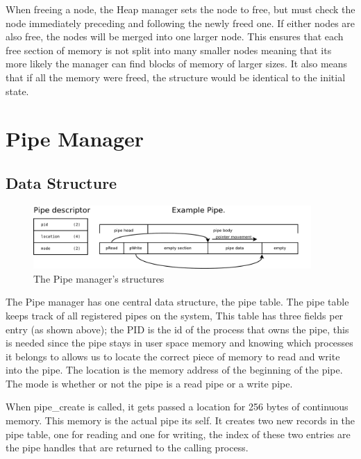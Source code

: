\documentclass[a4paper]{report}
\begin{document}
When freeing a node, the Heap manager sets the node to free, but must check the node immediately preceding and following the newly freed one. If either nodes are also free, the nodes will be merged into one larger node. This ensures that each free section of memory is not split into many smaller nodes meaning that its more likely the manager can find blocks of memory of larger sizes. It also means that if all the memory were freed, the structure would be identical to the initial state.
















\section{Pipe Manager}

\subsection{Data Structure}

\begin{figure}[ht]
\centering
\includegraphics[width=400px]{images/Pipe_Manager}
\caption{The Pipe manager's structures}
\label{fig:WinTitleBarScreen}
\end{figure}



The Pipe manager has one central data structure, the pipe table. The pipe table keeps track of all registered pipes on the system, This table has three fields per entry (as shown above); the PID is the id of the process that owns the pipe, this is needed since the pipe stays in user space memory and knowing which processes it belongs to allows us to locate the correct piece of memory to read and write into the pipe. The location is the memory address of the beginning of the pipe. The mode is whether or not the pipe is a read pipe or a write pipe.

When pipe\_create is called, it gets passed a location for 256 bytes of continuous memory. This memory is the actual pipe its self. It creates two new records in the pipe table, one for reading and one for writing, the index of these two entries are the pipe handles that are returned to the calling process.
\end{document}

